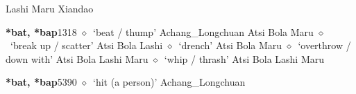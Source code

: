 \begin{list}{}{\leftmargin=1.5em \itemindent=-1.5em}
         Lashi 
\hspace{1ex}
         Maru 
\hspace{1ex}
         Xiandao 
  \item {\footnotesize \textbf{*bat, *bap}}{\tiny 1318}
\hspace{1ex}
         $\diamond$~`beat / thump'
         Achang\_Longchuan 
\hspace{1ex}
         Atsi 
\hspace{1ex}
         Bola 
\hspace{1ex}
         Maru 
\hspace{1ex}
         $\diamond$~`break up / scatter'
         Atsi 
\hspace{1ex}
         Bola 
\hspace{1ex}
         Lashi 
\hspace{1ex}
         $\diamond$~`drench'
         Atsi 
\hspace{1ex}
         Bola 
\hspace{1ex}
         Maru 
\hspace{1ex}
         $\diamond$~`overthrow / down with'
         Atsi 
\hspace{1ex}
         Bola 
\hspace{1ex}
         Lashi 
\hspace{1ex}
         Maru 
\hspace{1ex}
         $\diamond$~`whip / thrash'
         Atsi 
\hspace{1ex}
         Bola 
\hspace{1ex}
         Lashi 
\hspace{1ex}
         Maru 
  \item {\footnotesize \textbf{*bat, *bap}}{\tiny 5390}
\hspace{1ex}
         $\diamond$~`hit (a person)'
         Achang\_Longchuan 

\end{list}
